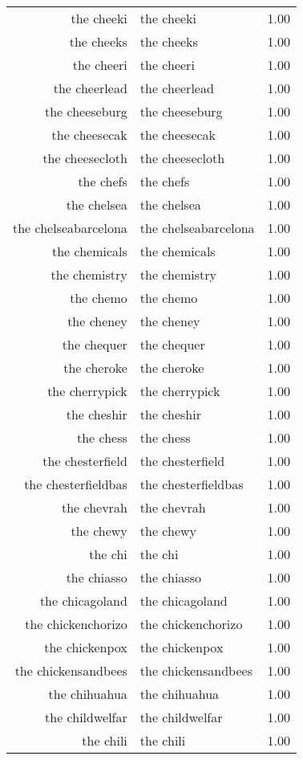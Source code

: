 \begin{table}[ht]
\begin{tabular}{rlr}
  the cheeki & the cheeki & 1.00 \\ 
  the cheeks & the cheeks & 1.00 \\ 
  the cheeri & the cheeri & 1.00 \\ 
  the cheerlead & the cheerlead & 1.00 \\ 
  the cheeseburg & the cheeseburg & 1.00 \\ 
  the cheesecak & the cheesecak & 1.00 \\ 
  the cheesecloth & the cheesecloth & 1.00 \\ 
  the chefs & the chefs & 1.00 \\ 
  the chelsea & the chelsea & 1.00 \\ 
  the chelseabarcelona & the chelseabarcelona & 1.00 \\ 
  the chemicals & the chemicals & 1.00 \\ 
  the chemistry & the chemistry & 1.00 \\ 
  the chemo & the chemo & 1.00 \\ 
  the cheney & the cheney & 1.00 \\ 
  the chequer & the chequer & 1.00 \\ 
  the cheroke & the cheroke & 1.00 \\ 
  the cherrypick & the cherrypick & 1.00 \\ 
  the cheshir & the cheshir & 1.00 \\ 
  the chess & the chess & 1.00 \\ 
  the chesterfield & the chesterfield & 1.00 \\ 
  the chesterfieldbas & the chesterfieldbas & 1.00 \\ 
  the chevrah & the chevrah & 1.00 \\ 
  the chewy & the chewy & 1.00 \\ 
  the chi & the chi & 1.00 \\ 
  the chiasso & the chiasso & 1.00 \\ 
  the chicagoland & the chicagoland & 1.00 \\ 
  the chickenchorizo & the chickenchorizo & 1.00 \\ 
  the chickenpox & the chickenpox & 1.00 \\ 
  the chickensandbees & the chickensandbees & 1.00 \\ 
  the chihuahua & the chihuahua & 1.00 \\ 
  the childwelfar & the childwelfar & 1.00 \\ 
  the chili & the chili & 1.00 \\ 

\end{tabular}
\end{table}
